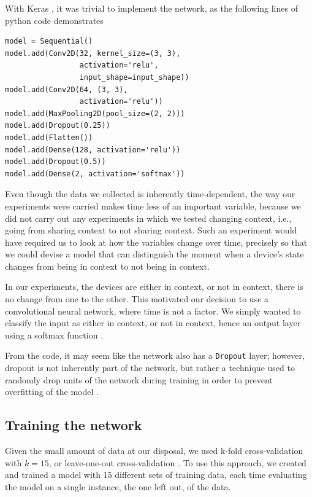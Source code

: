 \documentclass[journal]{IEEEtranTIE}
\begin{document}
With Keras \cite{Keras}, it was trivial to implement the network, as the
following lines of python code demonstrates

\begin{lstlisting}
model = Sequential()
model.add(Conv2D(32, kernel_size=(3, 3),
                 activation='relu',
                 input_shape=input_shape))
model.add(Conv2D(64, (3, 3),
                 activation='relu'))
model.add(MaxPooling2D(pool_size=(2, 2)))
model.add(Dropout(0.25))
model.add(Flatten())
model.add(Dense(128, activation='relu'))
model.add(Dropout(0.5))
model.add(Dense(2, activation='softmax'))
\end{lstlisting}

Even though the data we collected is inherently time-dependent, the way our
experiments were carried makes time less of an important variable, because we
did not carry out any experiments in which we tested changing context, i.e.,
going from sharing context to not sharing context. Such an experiment would have
required us to look at how the variables change over time, precisely so that we
could devise a model that can distinguish the moment when a device's state
changes from being in context to not being in context.

In our experiments, the devices are either in context, or not in context, there
is no change from one to the other. This motivated our decision to use a
convolutional neural network, where time is not a factor. We simply wanted to
classify the input as either in context, or not in context, hence an output
layer using a softmax function \cite{DeepLearning,LeCunn}.

From the code, it may seem like the network also has a \texttt{Dropout} layer;
however, dropout is not inherently part of the network, but rather a technique
used to randomly drop units of the network during training in order to prevent
overfitting of the model \cite{Dropout}.

\subsection{Training the network}

Given the small amount of data at our disposal, we used k-fold cross-validation
with $k=15$, or leave-one-out cross-validation \cite{StatLearn}. To use this
approach, we created and trained a model with 15 different sets of training
data, each time evaluating the model on a single instance, the one left out, of
the data.
\end{document}
